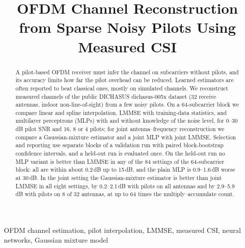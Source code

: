 \documentclass[conference]{IEEEtran}
\begin{document}
\title{OFDM Channel Reconstruction from Sparse Noisy Pilots Using Measured CSI}

\author{
}

\maketitle

\begin{abstract}
A pilot-based OFDM receiver must infer the channel on subcarriers without pilots, and its accuracy limits
how far the pilot overhead can be reduced. Learned estimators are often reported to beat classical ones,
mostly on simulated channels. We reconstruct measured channels of the public DICHASUS dichasus-005x
dataset (32 receive antennas, indoor non-line-of-sight) from a few noisy pilots. On a 64-subcarrier block
we compare linear and spline interpolation, LMMSE with training-data statistics, and multilayer
perceptrons (MLPs) with and without knowledge of the noise level, for 0--30\,dB pilot SNR and 16, 8 or 4
pilots; for joint antenna--frequency reconstruction we compare a Gaussian-mixture estimator and a joint
MLP with joint LMMSE. Selection and reporting use separate blocks of a validation run with paired
block-bootstrap confidence intervals, and a held-out run is evaluated once.
On the held-out run no MLP variant is better than LMMSE in any of the 84 settings of the 64-subcarrier
block: all are within about 0.2\,dB up to 15\,dB, and the plain MLP is 0.9--1.6\,dB worse at 30\,dB. In the
joint setting the Gaussian-mixture estimator is better than joint LMMSE in all eight settings, by
0.2--2.1\,dB with pilots on all antennas and by 2.9--5.9\,dB with pilots on 8 of 32 antennas, at up to 64
times the multiply--accumulate count.
\end{abstract}

\begin{IEEEkeywords}
OFDM channel estimation, pilot interpolation, LMMSE, measured CSI, neural networks, Gaussian mixture model
\end{IEEEkeywords}

\end{document}
